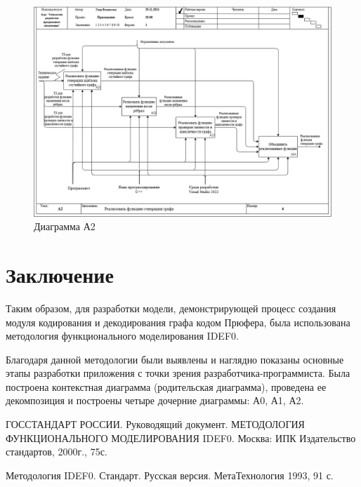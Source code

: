 \documentclass[a4paper, final]{article}
\begin{document}
\newpage
\begin{figure}[H]
	\centering
	\includegraphics[width=\linewidth]{A2.png}
	\caption{Диаграмма А2}
	\label{img:A2}
\end{figure}


\cleardoublepage
{}
\newpage
{}
\section*{Заключение}
Таким образом, для разработки модели, демонстрирующей процесс создания модуля кодирования и декодирования графа кодом Прюфера,
была использована методология функционального моделирования IDEF0.

Благодаря данной методологии были выявлены и наглядно показаны основные этапы разработки приложения с точки зрения 
разработчика-программиста. Была построена контекстная диаграмма (родительская диаграмма), проведена ее декомпозиция и 
построены четыре дочерние диаграммы: А0, А1, А2. 

\cleardoublepage
{}
\newpage
\begin{thebibliography}{0}
	ГОССТАНДАРТ РОССИИ. Руководящий документ. МЕТОДОЛОГИЯ ФУНКЦИОНАЛЬНОГО МОДЕЛИРОВАНИЯ IDEF0. 
	Москва: ИПК Издательство стандартов, 2000г., 75с.

	Методология IDEF0. Стандарт. Русская версия. МетаТехнология 1993, 91 с.
\end{thebibliography}
\end{document}
